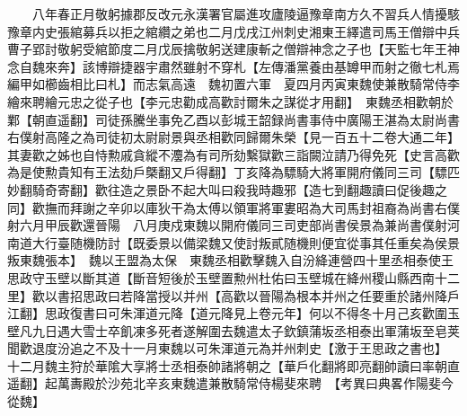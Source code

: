 　　八年春正月敬躬據郡反改元永漢署官屬進攻廬陵逼豫章南方久不習兵人情擾駭豫章内史張綰募兵以拒之綰纘之弟也二月戊戌江州刺史湘東王繹遣司馬王僧辯中兵曹子郢討敬躬受綰節度二月戊辰擒敬躬送建康斬之僧辯神念之子也【天監七年王神念自魏來奔】該博辯捷器宇肅然雖射不穿札【左傳潘黨養由基罇甲而射之徹七札焉編甲如櫛齒相比曰札】而志氣高遠　魏初置六軍　夏四月丙寅東魏使兼散騎常侍李繪來聘繪元忠之從子也【李元忠勸成高歡討爾朱之謀從才用翻】　東魏丞相歡朝於鄴【朝直遥翻】司徒孫騰坐事免乙酉以彭城王韶録尚書事侍中廣陽王湛為太尉尚書右僕射高隆之為司徒初太尉尉景與丞相歡同歸爾朱榮【見一百五十二卷大通二年】其妻歡之姊也自恃勲戚貪縱不灋為有司所劾繫獄歡三詣闕泣請乃得免死【史言高歡為是使勲貴知有王法劾戶槩翻又戶得翻】丁亥降為驃騎大將軍開府儀同三司【驃匹妙翻騎奇寄翻】歡往造之景卧不起大叫曰殺我時趣邪【造七到翻趣讀曰促後趣之同】歡撫而拜謝之辛卯以庫狄干為太傅以領軍將軍婁昭為大司馬封祖裔為尚書右僕射六月甲辰歡還晉陽　八月庚戍東魏以開府儀同三司吏部尚書侯景為兼尚書僕射河南道大行臺随機防討【既委景以備梁魏又使討叛貳随機則便宜從事其任重矣為侯景叛東魏張本】　魏以王盟為太保　東魏丞相歡擊魏入自汾絳連營四十里丞相泰使王思政守玉壁以斷其道【斷音短後於玉壁置勲州杜佑曰玉壁城在絳州稷山縣西南十二里】歡以書招思政曰若降當授以并州【高歡以晉陽為根本并州之任要重於諸州降戶江翻】思政復書曰可朱渾道元降【道元降見上卷元年】何以不得冬十月己亥歡圍玉壁凡九日遇大雪士卒飢凍多死者遂解圍去魏遣太子欽鎮蒲坂丞相泰出軍蒲坂至皂荚聞歡退度汾追之不及十一月東魏以可朱渾道元為并州刺史【激于王思政之書也】　十二月魏主狩於華隂大享將士丞相泰帥諸將朝之【華戶化翻將即亮翻帥讀曰率朝直遥翻】起萬夀殿於沙苑北辛亥東魏遣兼散騎常侍楊斐來聘　【考異曰典畧作陽斐今從魏】

